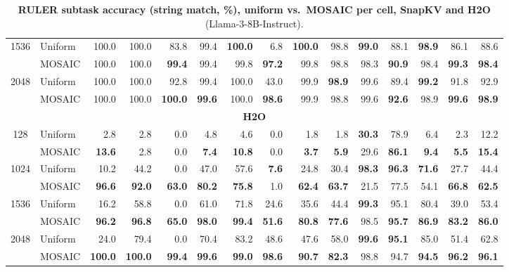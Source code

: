 \begin{table}[tp]
\begin{tabular}{@{} c l rrrrrrrrrrrrr @{}}
    \cmidrule(l){1-15}
    \multirow{2}{*}{1536} & Uniform & 100.0 & 100.0 & 83.8 & 99.4 & \textbf{100.0} & 6.8 & \textbf{100.0} & 98.8 & \textbf{99.0} & 88.1 & \textbf{98.9} & 86.1 & 88.6 \\
     & MOSAIC & 100.0 & 100.0 & \textbf{99.4} & 99.4 & 99.8 & \textbf{97.2} & 99.8 & 98.8 & 98.3 & \textbf{90.9} & 98.4 & \textbf{99.3} & \textbf{98.4} \\
    \cmidrule(l){1-15}
    \multirow{2}{*}{2048} & Uniform & 100.0 & 100.0 & 92.8 & 99.4 & 100.0 & 43.0 & 99.9 & \textbf{98.9} & 99.6 & 89.4 & \textbf{99.2} & 91.8 & 92.9 \\
     & MOSAIC & 100.0 & 100.0 & \textbf{100.0} & \textbf{99.6} & 100.0 & \textbf{98.6} & 99.9 & 98.8 & 99.6 & \textbf{92.6} & 98.9 & \textbf{99.6} & \textbf{98.9} \\
    \midrule
    \multicolumn{15}{c}{\textbf{H2O}} \\
    \midrule
    \multirow{2}{*}{128} & Uniform & 2.8 & 2.8 & 0.0 & 4.8 & 4.6 & 0.0 & 1.8 & 1.8 & \textbf{30.3} & 78.9 & 6.4 & 2.3 & 12.2 \\
     & MOSAIC & \textbf{13.6} & 2.8 & 0.0 & \textbf{7.4} & \textbf{10.8} & 0.0 & \textbf{3.7} & \textbf{5.9} & 29.6 & \textbf{86.1} & \textbf{9.4} & \textbf{5.5} & \textbf{15.4} \\
    \cmidrule(l){1-15}
    \multirow{2}{*}{1024} & Uniform & 10.2 & 44.2 & 0.0 & 47.0 & 57.6 & \textbf{7.6} & 24.8 & 30.4 & \textbf{98.3} & \textbf{96.3} & \textbf{71.6} & 27.7 & 44.4 \\
     & MOSAIC & \textbf{96.6} & \textbf{92.0} & \textbf{63.0} & \textbf{80.2} & \textbf{75.8} & 1.0 & \textbf{62.4} & \textbf{63.7} & 21.5 & 77.5 & 54.1 & \textbf{66.8} & \textbf{62.5} \\
    \cmidrule(l){1-15}
    \multirow{2}{*}{1536} & Uniform & 16.2 & 58.8 & 0.0 & 61.0 & 71.8 & 24.6 & 35.6 & 44.4 & \textbf{99.3} & 95.1 & 80.4 & 39.0 & 53.4 \\
     & MOSAIC & \textbf{96.2} & \textbf{96.8} & \textbf{65.0} & \textbf{98.0} & \textbf{99.4} & \textbf{51.6} & \textbf{80.8} & \textbf{77.6} & 98.5 & \textbf{95.7} & \textbf{86.9} & \textbf{83.2} & \textbf{86.0} \\
    \cmidrule(l){1-15}
    \multirow{2}{*}{2048} & Uniform & 24.0 & 79.4 & 0.0 & 70.4 & 83.2 & 48.6 & 47.6 & 58.0 & \textbf{99.6} & \textbf{95.1} & 85.0 & 51.4 & 62.8 \\
     & MOSAIC & \textbf{100.0} & \textbf{100.0} & \textbf{99.4} & \textbf{99.6} & \textbf{99.0} & \textbf{98.6} & \textbf{90.7} & \textbf{82.3} & 98.8 & 94.7 & \textbf{94.5} & \textbf{96.2} & \textbf{96.1} \\
    \bottomrule
  \end{tabular}
  \caption{\textbf{RULER subtask accuracy (string match, \%), uniform vs.\ MOSAIC per cell, SnapKV and H2O} (Llama-3-8B-Instruct).}
  \label{tab:app-ruler}
\end{table}


